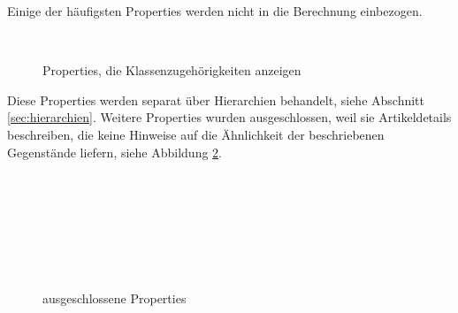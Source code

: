 \begin{rem}\label{rem:properties-exclusion-1}
Einige der häufigsten Properties werden nicht in die Berechnung einbezogen.
\begin{figure}[H]
\\
\caption{Properties, die Klassenzugehörigkeiten anzeigen}
\label{fig:properties_exclusion_1}
\end{figure}
Diese Properties werden separat über Hierarchien behandelt, siehe Abschnitt \ref{sec:hierarchien}.
Weitere Properties wurden ausgeschlossen, weil sie Artikeldetails beschreiben, die keine Hinweise auf die Ähnlichkeit der beschriebenen Gegenstände liefern, siehe Abbildung \ref{fig:properties_exclusion_2}.
\begin{figure}[H]
\\
\\
\\
\\
\\
\\
\caption{ausgeschlossene Properties}
\label{fig:properties_exclusion_2}
\end{figure}
\end{rem}

